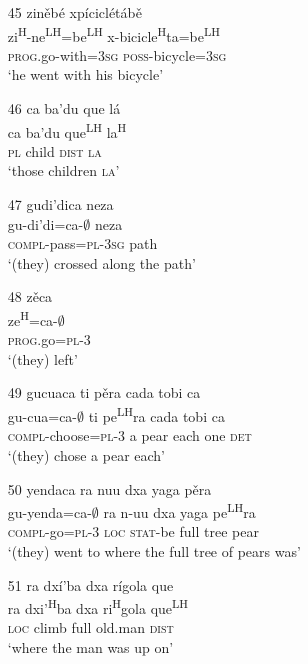\begin{itemize}
\item[45]
\glll zin\v{e}b\'{e} xp\'{i}cicl\'{e}t\'{a}b\v{e}\\
zi\textsuperscript{H}-ne\textsuperscript{LH}=be\textsuperscript{LH}  x-bicicle\textsuperscript{H}ta=be\textsuperscript{LH}\\
 \textsc{prog}.go-with=\textsc{3sg} \textsc{poss}-bicycle=\textsc{3sg}\\
\glt `he went with his bicycle'


\item[46]
\glll ca ba'du que l\'{a}\\
ca ba'du que\textsuperscript{LH} la\textsuperscript{H}\\
\textsc{pl} child \textsc{dist} \textsc{la}\\
\glt `those children \textsc{la}'


\item[47]
\glll gudi'dica neza\\
gu-di'di=ca-$\emptyset$ neza\\
\textsc{compl}-pass=\textsc{pl}-\textsc{3sg} path\\
\glt `(they) crossed along the path' 


\item[48]
\glll z\v{e}ca\\
 ze\textsuperscript{H}=ca-$\emptyset$\\
\textsc{prog}.go=\textsc{pl}-\textsc{3}\\
\glt `(they) left'


\item[49]
\glll gucuaca ti p\v{e}ra cada tobi ca\\
gu-cua=ca-$\emptyset$ ti pe\textsuperscript{LH}ra cada tobi ca\\
\textsc{compl}-choose=\textsc{pl}-\textsc{3} a pear each one \textsc{det}\\
\glt `(they) chose a pear each'


\item[50]
\glll yendaca ra nuu dxa yaga p\v{e}ra\\
gu-yenda=ca-$\emptyset$ ra n-uu dxa yaga pe\textsuperscript{LH}ra\\
\textsc{compl}-go=\textsc{pl}-\textsc{3} \textsc{loc} \textsc{stat}-be full tree pear\\
\glt `(they) went to where the full tree of pears was'


\item[51]
\glll ra dx\'{i}'ba dxa r\'{i}gola que\\
ra dxi'\textsuperscript{H}ba dxa ri\textsuperscript{H}gola que\textsuperscript{LH}\\
\textsc{loc} climb full old.man \textsc{dist}\\
\glt `where the man was up on'



\end{itemize}
